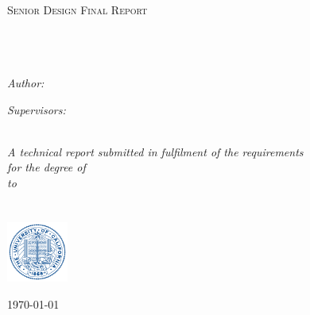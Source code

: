 \documentclass[12pt, oneside]{Thesis} %
\begin{document}
\begin{titlepage}
\begin{center}

\textsc{\LARGE \univname}\\[1.5cm] %
\textsc{\Large Senior Design Final Report }\\[0.5cm] %

\HRule \\[0.4cm] %
{\huge \bfseries \ttitle}\\[0.4cm] %
\HRule \\[1.5cm] %
 
\begin{minipage}{0.4\textwidth}
\begin{flushleft} \large
\emph{Author:}\\
\href{http://www.empireryan.com}{\authornames} %
\end{flushleft}
\end{minipage}
\begin{minipage}{0.4\textwidth}
\begin{flushright} \large
\emph{Supervisors:} \\
{\supname} %
\end{flushright}
\end{minipage}\\[3cm]
 
\large \textit{A technical report submitted in fulfilment of the requirements\\ for the degree of \degreename}\\[0.3cm] %
\textit{to}\\[0.4cm]
\groupname\\\deptname\\[2cm] %
\includegraphics[width=0.15\textwidth]{seal} %

{\large \today}\\[4cm] %
 
\vfill
\end{center}

\end{titlepage}
\end{document}
